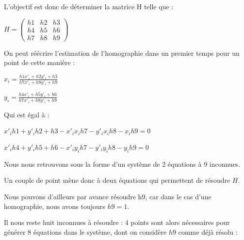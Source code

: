         L'objectif est donc de déterminer la matrice H telle que :
    
        \begin{center}
        $ H = \begin{pmatrix} h1 & h2 & h3 \\ h4 & h5 & h6 \\ h7 & h8 & h9 \end{pmatrix} $
        \end{center}
    
        On peut réécrire l'estimation de l'homographie dans un premier temps pour un point de cette manière :

        \begin{center}
            $x_i = \frac{h1x'_i + h2y'_i + h3}{h7x'_i + h8y'_i + h9} $  
        \end{center}
    
        \begin{center}
            $y_i = \frac{h4x'_i + h5y'_i + h6}{h7x'_i + h8y'_i + h9} $
        \end{center}
    
        Qui est égal à :
    
        \begin{center}
            $ x'_ih1 + y'_ih2 + h3 - x'_i x_ih7 - y'_ix_ih8 - x_ih9 = 0 $
    
            $ x'_ih4 + y'_ih5 + h6 - x'_iy_ih7 - y'_iy_ih8 - y_ih9 = 0 $
        \end{center}

        Nous nous retrouvons sous la forme d'un système de 2 équations à 9 inconnues.

        Un couple de point mène donc à deux équations qui permettent de résoudre $H$.
    
        Nous pouvons d'ailleurs par avance résoudre h9, car dans le cas d'une homographie, nous avons toujours $h9 = 1$.
    
        Il nous reste huit inconnues à résoudre : 4 points sont alors nécessaires pour générer 8 équations dans le système, dont on considère $h9$ comme déjà résolu : 

